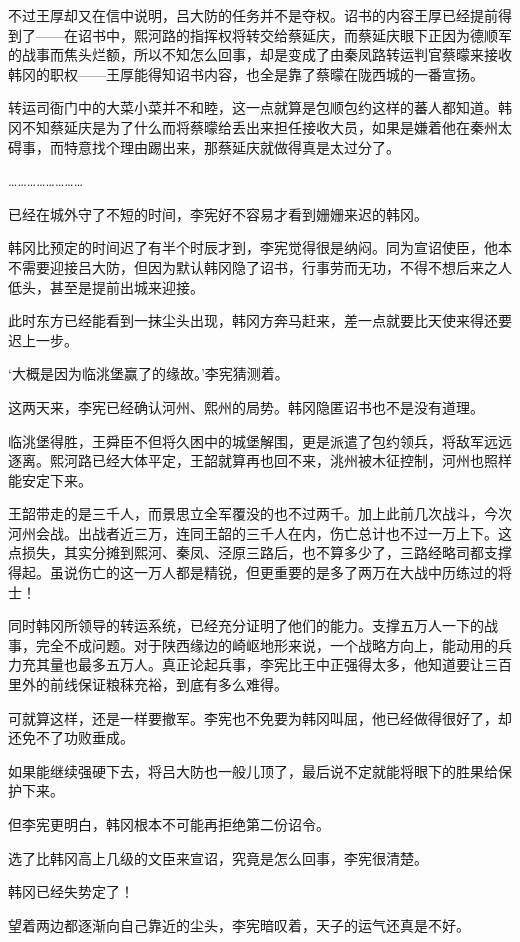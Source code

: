 不过王厚却又在信中说明，吕大防的任务并不是夺权。诏书的内容王厚已经提前得到了——在诏书中，熙河路的指挥权将转交给蔡延庆，而蔡延庆眼下正因为德顺军的战事而焦头烂额，所以不知怎么回事，却是变成了由秦凤路转运判官蔡曚来接收韩冈的职权——王厚能得知诏书内容，也全是靠了蔡曚在陇西城的一番宣扬。

转运司衙门中的大菜小菜并不和睦，这一点就算是包顺包约这样的蕃人都知道。韩冈不知蔡延庆是为了什么而将蔡曚给丢出来担任接收大员，如果是嫌着他在秦州太碍事，而特意找个理由踢出来，那蔡延庆就做得真是太过分了。

……………………

已经在城外守了不短的时间，李宪好不容易才看到姗姗来迟的韩冈。

韩冈比预定的时间迟了有半个时辰才到，李宪觉得很是纳闷。同为宣诏使臣，他本不需要迎接吕大防，但因为默认韩冈隐了诏书，行事劳而无功，不得不想后来之人低头，甚至是提前出城来迎接。

此时东方已经能看到一抹尘头出现，韩冈方奔马赶来，差一点就要比天使来得还要迟上一步。

‘大概是因为临洮堡赢了的缘故。’李宪猜测着。

这两天来，李宪已经确认河州、熙州的局势。韩冈隐匿诏书也不是没有道理。

临洮堡得胜，王舜臣不但将久困中的城堡解围，更是派遣了包约领兵，将敌军远远逐离。熙河路已经大体平定，王韶就算再也回不来，洮州被木征控制，河州也照样能安定下来。

王韶带走的是三千人，而景思立全军覆没的也不过两千。加上此前几次战斗，今次河州会战。出战者近三万，连同王韶的三千人在内，伤亡总计也不过一万上下。这点损失，其实分摊到熙河、秦凤、泾原三路后，也不算多少了，三路经略司都支撑得起。虽说伤亡的这一万人都是精锐，但更重要的是多了两万在大战中历练过的将士！

同时韩冈所领导的转运系统，已经充分证明了他们的能力。支撑五万人一下的战事，完全不成问题。对于陕西缘边的崎岖地形来说，一个战略方向上，能动用的兵力充其量也最多五万人。真正论起兵事，李宪比王中正强得太多，他知道要让三百里外的前线保证粮秣充裕，到底有多么难得。

可就算这样，还是一样要撤军。李宪也不免要为韩冈叫屈，他已经做得很好了，却还免不了功败垂成。

如果能继续强硬下去，将吕大防也一般儿顶了，最后说不定就能将眼下的胜果给保护下来。

但李宪更明白，韩冈根本不可能再拒绝第二份诏令。

选了比韩冈高上几级的文臣来宣诏，究竟是怎么回事，李宪很清楚。

韩冈已经失势定了！

望着两边都逐渐向自己靠近的尘头，李宪暗叹着，天子的运气还真是不好。


